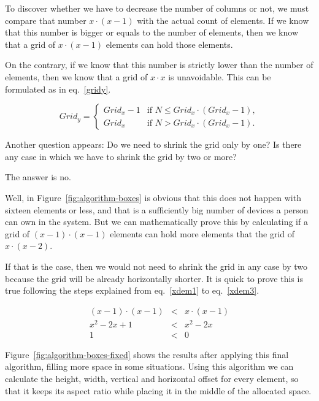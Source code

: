 To discover whether we have to decrease the number of columns or not, we must compare that number $x \cdot( x - 1)$ with the actual count of elements.
If we know that this number is bigger or equals to the number of elements, then we know that a grid of $x \cdot (x - 1)$ elements can hold those elements.

On the contrary, if we know that this number is strictly lower than the number of elements, then we know that a grid of $x \cdot x$ is unavoidable.
This can be formulated as in eq.~\eqref{gridy}.

\begin{equation}
  Grid_{y} = 
  \begin{cases}
    Grid_{x} - 1 & \text{if } N \leq Grid_{x} \cdot (Grid_{x} - 1),\\
    Grid_{x} & \text{if } N > Grid_{x} \cdot (Grid_{x} - 1).
  \end{cases} \label{gridy}
\end{equation}

Another question appears: Do we need to shrink the grid only by one?
Is there any case in which we have to shrink the grid by two or more?

The answer is no.

Well, in Figure~\ref{fig:algorithm-boxes} is obvious that this does not happen with sixteen elements or less, and that is a sufficiently big number of devices a person can own in the system.
But we can mathematically prove this by calculating if a grid of $(x - 1) \cdot (x - 1)$ elements can hold more elements that the grid of $x \cdot (x - 2)$.

If that is the case, then we would not need to shrink the grid in any case by two because the grid will be already horizontally shorter.
It is quick to prove this is true following the steps explained from eq.~\eqref{xdem1} to eq.~\eqref{xdem3}.

\begin{eqnarray}
  (x-1) \cdot (x-1) &<& x \cdot (x-1) \label{xdem1} \\
  x^2-2x+1 &<& x^2-2x \label{xdem2} \\
  1 &<& 0 \label{xdem3}
\end{eqnarray}

Figure~\ref{fig:algorithm-boxes-fixed} shows the results after applying this final algorithm, filling more space in some situations.
Using this algorithm we can calculate the height, width, vertical and horizontal offset for every element, so that it keeps its aspect ratio while placing it in the middle of the allocated space.

